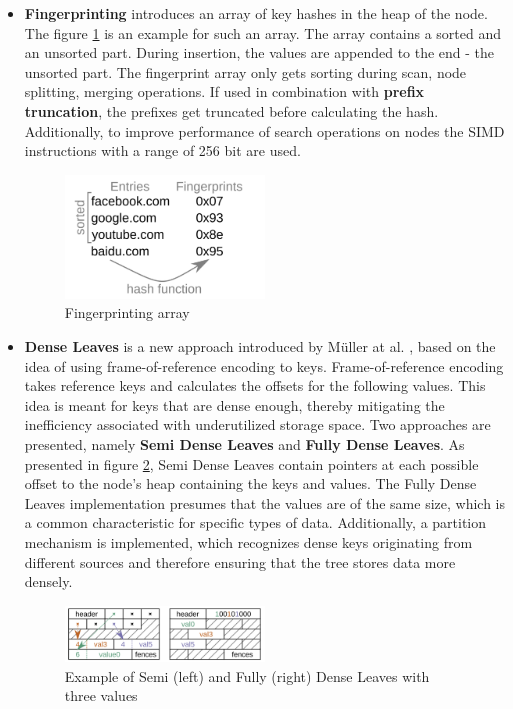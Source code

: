 \begin{itemize}
  \item \textbf{Fingerprinting} introduces an array of key hashes in the heap of the node. The figure \ref{fig:hash} is an example for such an array. The array contains a sorted and an unsorted part. During insertion, the values are appended to the end - the unsorted part. The fingerprint array only gets sorting during scan, node splitting, merging operations. If used in combination with \textbf{prefix truncation}, the prefixes get truncated before calculating the hash. Additionally, to improve performance of search operations on nodes the SIMD instructions with a range of 256 bit are used.
  
  \begin{figure}[h]
      \centering
      \includegraphics[width=0.5\textwidth]{images/hash.png}
      \caption{Fingerprinting array \parencite{mueller2024}}
      \label{fig:hash}
  \end{figure}
    
  \item \textbf{Dense Leaves} is a new approach introduced by Müller at al. \parencite{mueller2024}, based on the idea of using frame-of-reference encoding to keys. Frame-of-reference encoding takes reference keys and calculates the offsets for the following values. This idea is meant for keys that are dense enough, thereby mitigating the inefficiency associated with underutilized storage space. Two approaches are presented, namely \textbf{Semi Dense Leaves} and \textbf{Fully Dense Leaves}. As presented in figure \ref{fig:denseLeaves}, Semi Dense Leaves contain pointers at each possible offset to the node's heap containing the keys and values. The Fully Dense Leaves implementation presumes that the values are of the same size, which is a common characteristic for specific types of data. Additionally, a partition mechanism is implemented, which recognizes dense keys originating from different sources and therefore ensuring that the tree stores data more densely.

  \begin{figure}[h]
      \centering
      \includegraphics[width=0.5\textwidth]{images/denseLeaves.png}
      \caption{Example of Semi (left) and Fully (right) Dense Leaves with three values \parencite{mueller2024}}
      \label{fig:denseLeaves}
  \end{figure}
     
\end{itemize}

